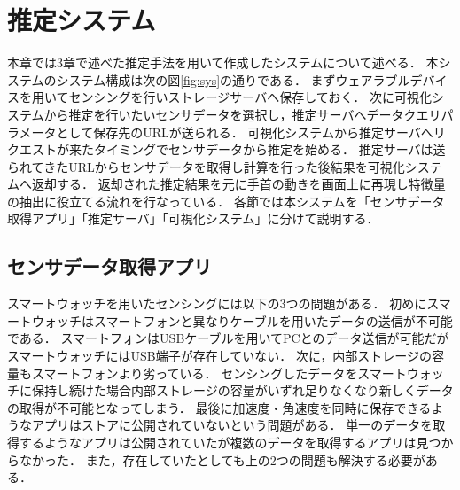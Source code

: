 \chapter{推定システム}
本章では3章で述べた推定手法を用いて作成したシステムについて述べる．
本システムのシステム構成は次の図\ref{fig:sys}の通りである．
まずウェアラブルデバイスを用いてセンシングを行いストレージサーバへ保存しておく．
次に可視化システムから推定を行いたいセンサデータを選択し，推定サーバへデータクエリパラメータとして保存先のURLが送られる．
可視化システムから推定サーバへリクエストが来たタイミングでセンサデータから推定を始める．
推定サーバは送られてきたURLからセンサデータを取得し計算を行った後結果を可視化システムへ返却する．
返却された推定結果を元に手首の動きを画面上に再現し特徴量の抽出に役立てる流れを行なっている．
各節では本システムを「センサデータ取得アプリ」「推定サーバ」「可視化システム」に分けて説明する．
\section{センサデータ取得アプリ}
スマートウォッチを用いたセンシングには以下の3つの問題がある．
初めにスマートウォッチはスマートフォンと異なりケーブルを用いたデータの送信が不可能である．
スマートフォンはUSBケーブルを用いてPCとのデータ送信が可能だがスマートウォッチにはUSB端子が存在していない．
次に，内部ストレージの容量もスマートフォンより劣っている．
センシングしたデータをスマートウォッチに保持し続けた場合内部ストレージの容量がいずれ足りなくなり新しくデータの取得が不可能となってしまう．
最後に加速度・角速度を同時に保存できるようなアプリはストアに公開されていないという問題がある．
単一のデータを取得するようなアプリは公開されていたが複数のデータを取得するアプリは見つからなかった．
また，存在していたとしても上の2つの問題も解決する必要がある．

